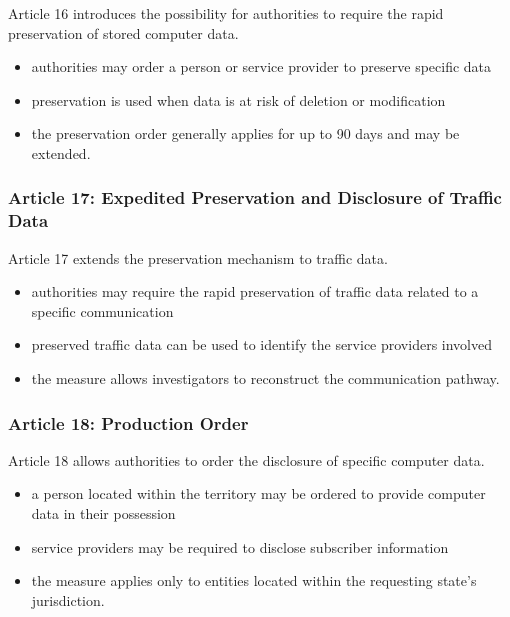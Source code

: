 Article 16 introduces the possibility for authorities to require the rapid preservation of stored computer data.

\begin{itemize}
\item authorities may order a person or service provider to preserve specific data
\item preservation is used when data is at risk of deletion or modification
\item the preservation order generally applies for up to 90 days and may be extended.
\end{itemize}



\subsubsection*{Article 17: Expedited Preservation and Disclosure of Traffic Data}

Article 17 extends the preservation mechanism to traffic data.

\begin{itemize}
\item authorities may require the rapid preservation of traffic data related to a specific communication
\item preserved traffic data can be used to identify the service providers involved
\item the measure allows investigators to reconstruct the communication pathway.
\end{itemize}



\subsubsection*{Article 18: Production Order}

Article 18 allows authorities to order the disclosure of specific computer data.

\begin{itemize}
\item a person located within the territory may be ordered to provide computer data in their possession
\item service providers may be required to disclose subscriber information
\item the measure applies only to entities located within the requesting state's jurisdiction.
\end{itemize}



